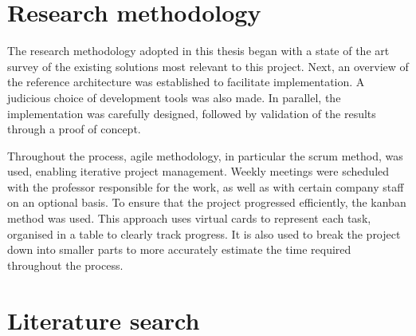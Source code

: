 \section{Research methodology}

The research methodology adopted in this thesis began with a state of the art survey of the existing solutions most relevant to this project. Next, an overview of the reference architecture was established to facilitate implementation. A judicious choice of development tools was also made. In parallel, the implementation was carefully designed, followed by validation of the results through a proof of concept.

Throughout the process, agile methodology, in particular the \gls{scrum} method, was used, enabling iterative project management. Weekly meetings were scheduled with the professor responsible for the work, as well as with certain company staff on an optional basis. To ensure that the project progressed efficiently, the \gls{kanban} method was used. This approach uses virtual cards to represent each task, organised in a table to clearly track progress. It is also used to break the project down into smaller parts to more accurately estimate the time required throughout the process.


\section{Literature search}

